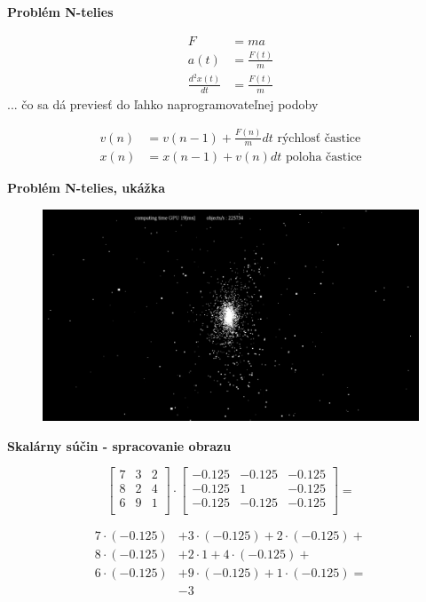 \documentclass[xcolor=dvipsnames]{beamer}
\begin{document}
\begin{frame}{\bf Problém N-telies}

\begin{align*}
F &= ma \\
a(t) &= \frac{F(t)}{m} \\
\frac{d^2x(t)}{dt} &= \frac{F(t)}{m}
\end{align*}
... čo sa dá previesť do ľahko naprogramovateľnej podoby

\begin{align*}
v(n) &= v(n-1) + \frac{F(n)}{m}dt \text{ rýchlosť častice}\\
x(n) &= x(n-1) + v(n)dt \text{ poloha častice}
\end{align*}

\end{frame}

\begin{frame}{\bf Problém N-telies, ukážka}

\begin{figure}[htbp]
  \centering
    \includegraphics[scale=0.2]{n_body_animation.png}
\end{figure}

\end{frame}


\begin{frame}{\bf Skalárny súčin - spracovanie obrazu}


\[
\begin{bmatrix}
    7  & 3 & 2 \\
    8  & 2 & 4 \\
    6  & 9 & 1 \\
\end{bmatrix}
\cdot
\begin{bmatrix}
    -0.125  & -0.125 & -0.125 \\
    -0.125  & 1 & -0.125 \\
    -0.125  & -0.125 & -0.125 \\
\end{bmatrix}
= \]

\begin{align*}
7\cdot(-0.125) &+ 3\cdot(-0.125) + 2\cdot(-0.125) + \\
8\cdot(-0.125) &+ 2\cdot1 + 4\cdot(-0.125) + \\
6\cdot(-0.125) &+ 9\cdot(-0.125) + 1\cdot(-0.125) = \\
&-3
\end{align*}

\end{frame}
\end{document}
